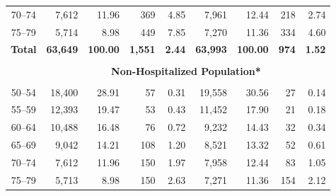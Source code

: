 \begin{landscape}
\begin{table}[H]
\begin{tabular}{ccccccccc}
    70--74 & \multicolumn{1}{r}{7,612} & \multicolumn{1}{r}{11.96} & \multicolumn{1}{r}{369} & \multicolumn{1}{r}{4.85} & \multicolumn{1}{r}{7,961} & \multicolumn{1}{r}{12.44} & \multicolumn{1}{r}{218} & \multicolumn{1}{r}{2.74} \\
    75--79 & \multicolumn{1}{r}{5,714} & \multicolumn{1}{r}{8.98} & \multicolumn{1}{r}{449} & \multicolumn{1}{r}{7.85} & \multicolumn{1}{r}{7,270} & \multicolumn{1}{r}{11.36} & \multicolumn{1}{r}{334} & \multicolumn{1}{r}{4.60} \\
    \textbf{Total} & \multicolumn{1}{r}{\textbf{63,649}} & \multicolumn{1}{r}{\textbf{100.00}} & \multicolumn{1}{r}{\textbf{1,551}} & \multicolumn{1}{r}{\textbf{2.44}} & \multicolumn{1}{r}{\textbf{63,993}} & \multicolumn{1}{r}{\textbf{100.00}} & \multicolumn{1}{r}{\textbf{974}} & \multicolumn{1}{r}{\textbf{1.52}} \\
          &       &       &       &       &       &       &       &  \\
          & \multicolumn{8}{c}{\textbf{Non-Hospitalized Population*}} \\
          &       &       &       &       &       &       &       &  \\
    50--54 & \multicolumn{1}{r}{18,400} & \multicolumn{1}{r}{28.91} & \multicolumn{1}{r}{57} & \multicolumn{1}{r}{0.31} & \multicolumn{1}{r}{19,558} & \multicolumn{1}{r}{30.56} & \multicolumn{1}{r}{27} & \multicolumn{1}{r}{0.14} \\
    55--59 & \multicolumn{1}{r}{12,393} & \multicolumn{1}{r}{19.47} & \multicolumn{1}{r}{53} & \multicolumn{1}{r}{0.43} & \multicolumn{1}{r}{11,452} & \multicolumn{1}{r}{17.90} & \multicolumn{1}{r}{21} & \multicolumn{1}{r}{0.18} \\
    60--64 & \multicolumn{1}{r}{10,488} & \multicolumn{1}{r}{16.48} & \multicolumn{1}{r}{76} & \multicolumn{1}{r}{0.72} & \multicolumn{1}{r}{9,232} & \multicolumn{1}{r}{14.43} & \multicolumn{1}{r}{32} & \multicolumn{1}{r}{0.34} \\
    65--69 & \multicolumn{1}{r}{9,042} & \multicolumn{1}{r}{14.21} & \multicolumn{1}{r}{108} & \multicolumn{1}{r}{1.20} & \multicolumn{1}{r}{8,521} & \multicolumn{1}{r}{13.32} & \multicolumn{1}{r}{52} & \multicolumn{1}{r}{0.61} \\
    70--74 & \multicolumn{1}{r}{7,612} & \multicolumn{1}{r}{11.96} & \multicolumn{1}{r}{150} & \multicolumn{1}{r}{1.97} & \multicolumn{1}{r}{7,958} & \multicolumn{1}{r}{12.44} & \multicolumn{1}{r}{83} & \multicolumn{1}{r}{1.05} \\
    75--79 & \multicolumn{1}{r}{5,713} & \multicolumn{1}{r}{8.98} & \multicolumn{1}{r}{150} & \multicolumn{1}{r}{2.63} & \multicolumn{1}{r}{7,271} & \multicolumn{1}{r}{11.36} & \multicolumn{1}{r}{154} & \multicolumn{1}{r}{2.12} \\

\end{tabular}
\end{table}
\end{landscape}
